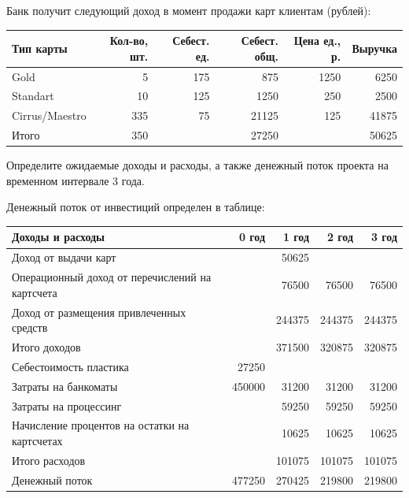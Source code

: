 \documentclass[12pt, table, a4paper,twoside]{exam}
\begin{document}
\begin{questions}
\begin{subparts}
	\begin{solution}[12em]
		
		Банк получит следующий доход в момент продажи карт клиентам (рублей):
		
		\begin{tabularx}{\linewidth}[b]{@{}>{\raggedright\arraybackslash}Xrrrrr@{}}	\toprule
			Тип карты & Кол-во, шт. & Себест. ед. & Себест. общ. & Цена ед., р. & Выручка \\
			\midrule
			Gold  & 5     & 175   & 875   & 1250  & 6250 \\
			Standart & 10    & 125   & 1250  & 250   & 2500 \\
			Cirrus/Maestro & 335   & 75    & 21125 & 125   & 41875 \\
			\midrule
			Итого & 350   &       & 27250 &       & 50625 \\
			\bottomrule
		\end{tabularx}%
						
	\end{solution}
	
	\subpart[10] Определите ожидаемые доходы и расходы, а также денежный поток проекта на временном интервале 3 года. 
	
	\begin{solution}[12em]
		
		Денежный поток от инвестиций определен в таблице:
				
			\begin{tabularx}{\linewidth}[b]{@{}>{\raggedright\arraybackslash}Xrrrr@{}}	\toprule
				Доходы и расходы & 0 год & 1 год & 2 год & 3 год \\
				\midrule
				Доход от выдачи карт &       & 50625 &       &  \\
				Операционный доход от перечислений на картсчета &       & 76500 & 76500 & 76500 \\
				Доход от размещения привлеченных средств &       & 244375 & 244375 & 244375 \\
				\midrule
				Итого доходов &       & 371500 & 320875 & 320875 \\
				\midrule
				Себестоимость пластика & 27250 &       &       &  \\
				Затраты на банкоматы & 450000 & 31200 & 31200 & 31200 \\
				Затраты на процессинг &       & 59250 & 59250 & 59250 \\
				Начисление процентов на остатки на картсчетах &       & 10625 & 10625 & 10625 \\
				\midrule
				Итого расходов &       & 101075 & 101075 & 101075 \\
				\midrule
				Денежный поток & 477250 & 270425 & 219800 & 219800 \\
				\bottomrule
			\end{tabularx}%
				

\end{solution}
\end{subparts}
\end{questions}
\end{document}
